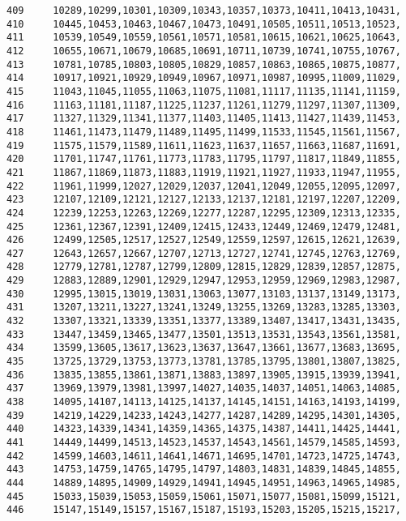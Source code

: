 \begin{Code}
\begin{verbatim}
409     10289,10299,10301,10309,10343,10357,10373,10411,10413,10431,
410     10445,10453,10463,10467,10473,10491,10505,10511,10513,10523,
411     10539,10549,10559,10561,10571,10581,10615,10621,10625,10643,
412     10655,10671,10679,10685,10691,10711,10739,10741,10755,10767,
413     10781,10785,10803,10805,10829,10857,10863,10865,10875,10877,
414     10917,10921,10929,10949,10967,10971,10987,10995,11009,11029,
415     11043,11045,11055,11063,11075,11081,11117,11135,11141,11159,
416     11163,11181,11187,11225,11237,11261,11279,11297,11307,11309,
417     11327,11329,11341,11377,11403,11405,11413,11427,11439,11453,
418     11461,11473,11479,11489,11495,11499,11533,11545,11561,11567,
419     11575,11579,11589,11611,11623,11637,11657,11663,11687,11691,
420     11701,11747,11761,11773,11783,11795,11797,11817,11849,11855,
421     11867,11869,11873,11883,11919,11921,11927,11933,11947,11955,
422     11961,11999,12027,12029,12037,12041,12049,12055,12095,12097,
423     12107,12109,12121,12127,12133,12137,12181,12197,12207,12209,
424     12239,12253,12263,12269,12277,12287,12295,12309,12313,12335,
425     12361,12367,12391,12409,12415,12433,12449,12469,12479,12481,
426     12499,12505,12517,12527,12549,12559,12597,12615,12621,12639,
427     12643,12657,12667,12707,12713,12727,12741,12745,12763,12769,
428     12779,12781,12787,12799,12809,12815,12829,12839,12857,12875,
429     12883,12889,12901,12929,12947,12953,12959,12969,12983,12987,
430     12995,13015,13019,13031,13063,13077,13103,13137,13149,13173,
431     13207,13211,13227,13241,13249,13255,13269,13283,13285,13303,
432     13307,13321,13339,13351,13377,13389,13407,13417,13431,13435,
433     13447,13459,13465,13477,13501,13513,13531,13543,13561,13581,
434     13599,13605,13617,13623,13637,13647,13661,13677,13683,13695,
435     13725,13729,13753,13773,13781,13785,13795,13801,13807,13825,
436     13835,13855,13861,13871,13883,13897,13905,13915,13939,13941,
437     13969,13979,13981,13997,14027,14035,14037,14051,14063,14085,
438     14095,14107,14113,14125,14137,14145,14151,14163,14193,14199,
439     14219,14229,14233,14243,14277,14287,14289,14295,14301,14305,
440     14323,14339,14341,14359,14365,14375,14387,14411,14425,14441,
441     14449,14499,14513,14523,14537,14543,14561,14579,14585,14593,
442     14599,14603,14611,14641,14671,14695,14701,14723,14725,14743,
443     14753,14759,14765,14795,14797,14803,14831,14839,14845,14855,
444     14889,14895,14909,14929,14941,14945,14951,14963,14965,14985,
445     15033,15039,15053,15059,15061,15071,15077,15081,15099,15121,
446     15147,15149,15157,15167,15187,15193,15203,15205,15215,15217,

\end{verbatim}
\end{Code}

